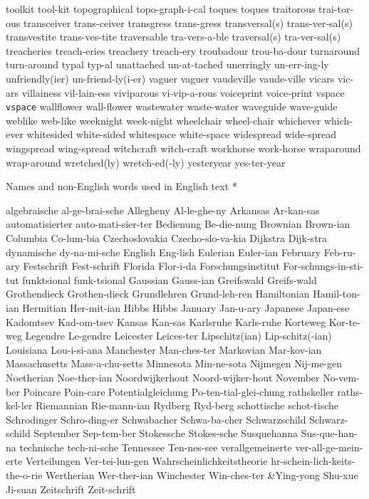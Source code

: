 \1 toolkit		tool-kit
\1 topographical	topo-graph-i-cal
\1 toques		toques
\1 traitorous		trai-tor-ous
\1 transceiver		trans-ceiver
\1 transgress		trans-gress
\1 transversal(s)	trans-ver-sal(s)
\1 transvestite		trans-ves-tite
\1 traversable		tra-vers-a-ble
\1 traversal(s)		tra-ver-sal(s)
\1 treacheries		treach-eries
\1 treachery		treach-ery
\1 troubadour		trou-ba-dour
\1 turnaround		turn-around
\1 typal		typ-al
\1 unattached		un-at-tached
\1 unerringly		un-err-ing-ly
\1 unfriendly(ier)	un-friend-ly(i-er)
\1 vaguer		vaguer
\1 vaudeville		vaude-ville
\1 vicars		vic-ars
\1 villainess		vil-lain-ess
\1 viviparous		vi-vip-a-rous
\1 voiceprint		voice-print
\1 vspace 		{\tt\bs vspace}
\1 wallflower		wall-flower
\1 wastewater		waste-water
\1 waveguide		wave-guide
\1 weblike		web-like
\1 weeknight		week-night
\1 wheelchair		wheel-chair
\1 whichever		which-ever
\1 whitesided		white-sided
\1 whitespace		white-space
\1 widespread		wide-spread
\1 wingspread		wing-spread
\1 witchcraft		witch-craft
\1 workhorse		work-horse
\1 wraparound		wrap-around
\1 wretched(ly)		wretch-ed(-ly)
\1 yesteryear		yes-ter-year
\endgraf
\endgroup

\head * Names and non-English words \break used in English text *

\begingroup
\eightpoint
\1 algebraische 	al-ge-brai-sche
\1 Allegheny		Al-le-ghe-ny
\1 Arkansas		Ar-kan-sas
\1 automatisierter	auto-mati-sier-ter
\1 Bedienung		Be-die-nung
\1 Brownian		Brown-ian
\1 Columbia		Co-lum-bia
\1 Czechoslovakia	Czecho-slo-va-kia
\1 Dijkstra		Dijk-stra
\1 dynamische		dy-na-mi-sche
\1 English		Eng-lish
\1 Eulerian		Euler-ian
\1 February		Feb-ru-ary
\1 Festschrift		Fest-schrift
\1 Florida		Flor-i-da
\1 Forschungsinstitut	For-schungs-in-sti-tut
\1 funktsional		funk-tsional
\1 Gaussian		Gauss-ian
\1 Greifswald		Greifs-wald
\1 Grothendieck		Grothen-dieck
\1 Grundlehren		Grund-leh-ren
\1 Hamiltonian		Hamil-ton-ian
\1 Hermitian		Her-mit-ian
\1 Hibbs		Hibbs
\1 January		Jan-u-ary
\1 Japanese		Japan-ese
\1 Kadomtsev		Kad-om-tsev
\1 Kansas		Kan-sas
\1 Karlsruhe		Karls-ruhe
\1 Korteweg		Kor-te-weg
\1 Legendre		Le-gendre
\1 Leicester		Leices-ter
\1 Lipschitz(ian)	Lip-schitz(-ian)
\1 Louisiana		Lou-i-si-ana
\1 Manchester		Man-ches-ter
\1 Markovian		Mar-kov-ian
\1 Massachusetts	Mass-a-chu-setts
\1 Minnesota		Min-ne-sota
\1 Nijmegen		Nij-me-gen
\1 Noetherian		Noe-ther-ian
\1 Noordwijkerhout	Noord-wijker-hout
\1 November		No-vem-ber
\1 Poincare		Poin-care
\1 Potentialgleichung	Po-ten-tial-glei-chung
\1 rathskeller		raths-kel-ler
\1 Riemannian		Rie-mann-ian
\1 Rydberg		Ryd-berg
\1 schottische		schot-tische
\1 Schrodinger		Schro-ding-er
\1 Schwabacher		Schwa-ba-cher
\1 Schwarzschild	Schwarz-schild
\1 September		Sep-tem-ber
\1 Stokessche		Stokes-sche
\1 Susquehanna		Sus-que-han-na
\1 technische		tech-ni-sche
\1 Tennessee		Ten-nes-see
\1 verallgemeinerte	ver-all-ge-mein-erte
\1 Verteilungen 	Ver-tei-lun-gen
\1 Wahrscheinlichkeitstheorie  hr-schein-lich-keits-the-o-rie
\1 Wertherian		Wer-ther-ian
\1 Winchester		Win-ches-ter
\tabalign {}&Ying-yong Shu-xue Ji-suan\cr
\1 Zeitschrift		Zeit-schrift
\endgraf
\endgroup

\endarticle

